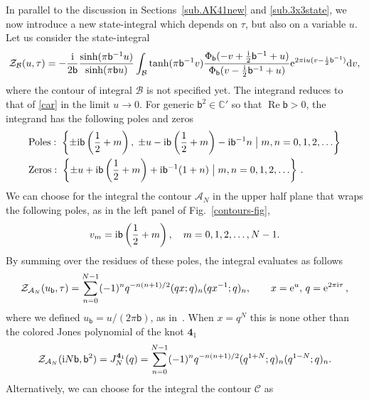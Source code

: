 \documentclass[12pt,reqno]{amsart}
\theoremstyle{definition}
\def\calB{\mathcal B}
\def\bb{\mathsf{b}}
\def\ri{\mathrm{i}}
\def\rd{\mathrm{d}}
\def\re{{\rm e}}
\def\ri{{\rm i}}
\def\rd{{\rm d}}
\def\ub{u_{\mathsf{b}}}
\def\mc{\mathcal}
\def\md{\mathbf}
\def\IC{\mathbb{C}}
\newcommand{\knot}[1]{\md{#1}}
\DeclareMathOperator{\real}{Re}
\begin{document}
In parallel to the discussion in Sections~\ref{sub.AK41new} and \ref{sub.3x3state}, we
now introduce a new state-integral which depends on $\tau$, but also on a variable $u$. 
Let us consider the state-integral 
\begin{equation}
  \mc{Z}_\calB(u,\tau) = -\frac{\ri}{2\bb}\frac{\sinh(\pi \bb^{-1} u)}
  {\sinh(\pi \bb u)}
  \int_{\calB} \tanh(\pi\bb^{-1}v)
  \frac{\Phi_\bb(-v+\frac{\ri}{2}\bb^{-1}+u)}
  {\Phi_\bb(v-\frac{\ri}{2}\bb^{-1}+u)}
  \re^{2\pi\ri u(v-\frac{\ri}{2}\bb^{-1})} \rd v,
\end{equation}
where the contour of integral $\calB$ is not specified yet. The integrand
reduces to that of \eqref{car} in the limit $u\rightarrow 0$.  For
generic $\bb^2\in\IC'$ so that $\real\bb>0$, the integrand has the following poles
and zeros
\begin{equation}
  \begin{aligned}
    &\text{Poles}:\; \left\{\pm \ri\bb\left(\frac{1}{2}+m\right),\;
      \pm u -\ri\bb\left(\frac{1}{2}+m\right)-\ri\bb^{-1}n\;\big|\;
      m,n=0,1,2,\ldots
    \right\}\\
    &\text{Zeros}:\; \left\{
      \pm u +\ri\bb\left(\frac{1}{2}+m \right)+\ri\bb^{-1}(1+n)\;\big|\;
      m,n=0,1,2,\ldots
    \right\} \,.
  \end{aligned}
  \label{eq:PZ41x}
\end{equation}
We can choose for the integral the contour $\mc{A}_N$ in the upper half
plane that wraps the following poles, as in the left panel of
Fig.~\ref{contours-fig}, 
%
\begin{equation}
\label{vm-poles}
  v_m = \ri\bb\left(\frac{1}{2}+m\right),\quad m=0,1,2,\ldots,N-1.
\end{equation}
By summing over the residues of these poles, the integral evaluates
as follows
%
\begin{equation}
  \mc{Z}_{\mc{A}_N}(\ub,\tau) = \sum_{n=0}^{N-1}(-1)^n
  q^{-n(n+1)/2}(qx;q)_n(qx^{-1};q)_n,\qquad
  x= \re^{u},\, q=\re^{2\pi\ri\tau} \,,
\end{equation}
%
where we defined $\ub=u/(2\pi \bb)$, as in~\cite[Eqn.(2)]{GGM:peacock}.
When $x = q^N$ this is none other
than the colored Jones polynomial of the knot $\knot{4}_1$
%
\begin{equation}
\label{aint-habiro}
  \mc{Z}_{\mc{A}_N}(\ri N\bb,\bb^2) = J_N^{\knot{4}_1}(q) =
  \sum_{n=0}^{N-1}(-1)^n
  q^{-n(n+1)/2}(q^{1+N};q)_n(q^{1-N};q)_n.
\end{equation}
%
Alternatively, we can choose for the integral the contour $\mc{C}$ as
\end{document}
